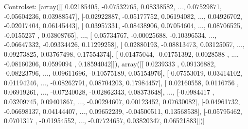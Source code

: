 \documentclass{article}
\begin{document}
Controlset: [array([[ 0.02185405, -0.07532765,  0.08338582, ...,  0.07529871,
        -0.05604236,  0.03988547],
       [-0.02922887, -0.05177752,  0.06194082, ...,  0.04926702,
        -0.02017404,  0.06145443],
       [ 0.03957331, -0.08438906,  0.07054604, ...,  0.08706525,
        -0.0155237 ,  0.03808765],
       ..., 
       [ 0.05734767, -0.00025688, -0.10396534, ..., -0.06647332,
        -0.09334426,  0.11299258],
       [ 0.02880193, -0.08813473,  0.03125057, ...,  0.09273825,
         0.03767498,  0.17554374],
       [ 0.01475044, -0.01751392,  0.0028588 , ..., -0.08160206,
         0.0599094 ,  0.18594042]]), array([[ 0.0239333 ,  0.09136882, -0.08223796, ...,  0.09611696,
        -0.10575189,  0.05154976],
       [-0.07553019,  0.03414102,  0.01194246, ..., -0.08262791,
         0.08704203,  0.17984457],
       [ 0.02160558,  0.0116756 ,  0.06919261, ..., -0.07240028,
        -0.02862343,  0.08373648],
       ..., 
       [-0.0984417 ,  0.03209745,  0.09401867, ..., -0.00294607,
         0.00123452,  0.07630082],
       [-0.04961732, -0.06698137,  0.04144407, ...,  0.09652239,
        -0.04500511,  0.13568538],
       [-0.05795462,  0.0701317 , -0.01954552, ..., -0.07724657,
         0.03820347,  0.06521883]])]
\end{document}
